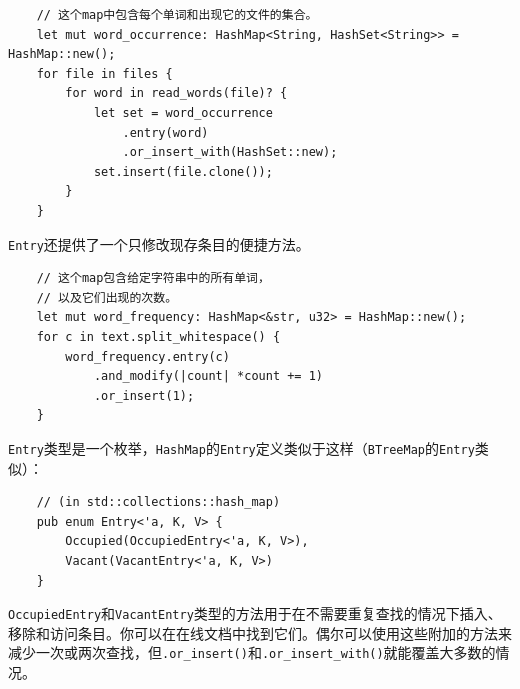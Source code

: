
\begin{verbatim}
    // 这个map中包含每个单词和出现它的文件的集合。
    let mut word_occurrence: HashMap<String, HashSet<String>> = HashMap::new();
    for file in files {
        for word in read_words(file)? {
            let set = word_occurrence
                .entry(word)
                .or_insert_with(HashSet::new);
            set.insert(file.clone());
        }
    }
\end{verbatim}

\texttt{Entry}还提供了一个只修改现存条目的便捷方法。

\begin{verbatim}
    // 这个map包含给定字符串中的所有单词，
    // 以及它们出现的次数。
    let mut word_frequency: HashMap<&str, u32> = HashMap::new();
    for c in text.split_whitespace() {
        word_frequency.entry(c)
            .and_modify(|count| *count += 1)
            .or_insert(1);
    }
\end{verbatim}

\texttt{Entry}类型是一个枚举，\texttt{HashMap}的\texttt{Entry}定义类似于这样（\texttt{BTreeMap}的\texttt{Entry}类似）：
\begin{verbatim}
    // (in std::collections::hash_map)
    pub enum Entry<'a, K, V> {
        Occupied(OccupiedEntry<'a, K, V>),
        Vacant(VacantEntry<'a, K, V>)
    }
\end{verbatim}

\texttt{OccupiedEntry}和\texttt{VacantEntry}类型的方法用于在不需要重复查找的情况下插入、移除和访问条目。你可以在在线文档中找到它们。偶尔可以使用这些附加的方法来减少一次或两次查找，但\texttt{.or\_insert()}和\texttt{.or\_insert\_with()}就能覆盖大多数的情况。

